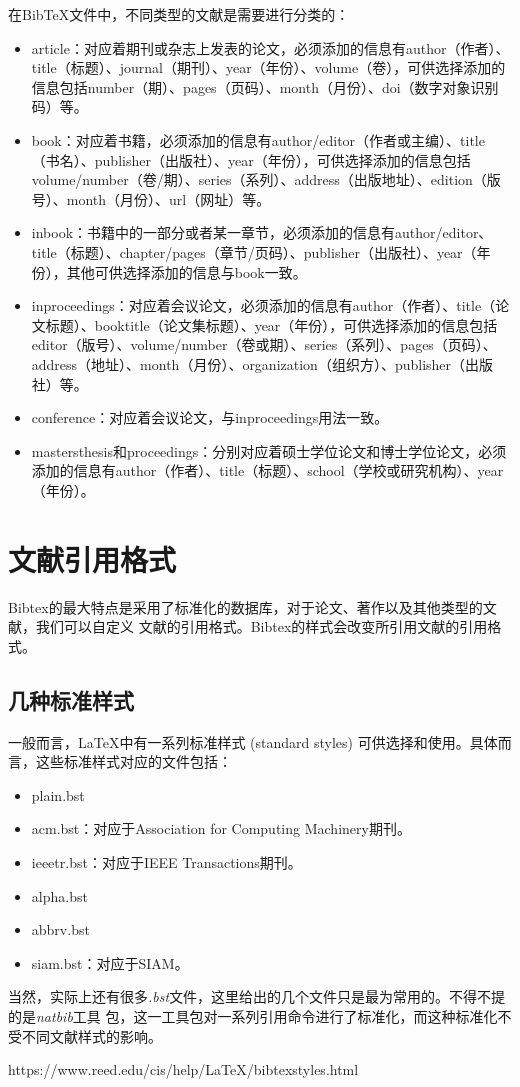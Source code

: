 在BibTeX文件中，不同类型的文献是需要进行分类的：
\begin{itemize}
    \item article：对应着期刊或杂志上发表的论文，必须添加的信息有author（作者）、title（标题）、journal（期刊）、year（年份）、volume（卷），可供选择添加的信息包括number（期）、pages（页码）、month（月份）、doi（数字对象识别码）等。
    \item book：对应着书籍，必须添加的信息有author/editor（作者或主编）、title（书名）、publisher（出版社）、year（年份），可供选择添加的信息包括volume/number（卷/期）、series（系列）、address（出版地址）、edition（版号）、month（月份）、url（网址）等。
    \item inbook：书籍中的一部分或者某一章节，必须添加的信息有author/editor、title（标题）、chapter/pages（章节/页码）、publisher（出版社）、year（年份），其他可供选择添加的信息与book一致。
    \item inproceedings：对应着会议论文，必须添加的信息有author（作者）、title（论文标题）、booktitle（论文集标题）、year（年份），可供选择添加的信息包括editor（版号）、volume/number（卷或期）、series（系列）、pages（页码）、address（地址）、month（月份）、organization（组织方）、publisher（出版社）等。
    \item conference：对应着会议论文，与inproceedings用法一致。
    \item mastersthesis和proceedings：分别对应着硕士学位论文和博士学位论文，必须添加的信息有author（作者）、title（标题）、school（学校或研究机构）、year（年份）。
\end{itemize}

\section{文献引用格式}

Bibtex的最大特点是采用了标准化的数据库，对于论文、著作以及其他类型的文献，我们可以自定义
文献的引用格式。Bibtex的样式会改变所引用文献的引用格式。

\subsection{几种标准样式}

一般而言，LaTeX中有一系列标准样式 (standard styles) 可供选择和使用。具体而言，这些标准样式对应的文件包括：
\begin{itemize}
    \item plain.bst
    \item acm.bst：对应于Association for Computing Machinery期刊。
    \item ieeetr.bst：对应于IEEE Transactions期刊。
    \item alpha.bst
    \item abbrv.bst
    \item siam.bst：对应于SIAM。
\end{itemize}

当然，实际上还有很多\emph{.bst}文件，这里给出的几个文件只是最为常用的。不得不提的是\emph{natbib}工具
包，这一工具包对一系列引用命令进行了标准化，而这种标准化不受不同文献样式的影响。

\begin{tcolorbox}[colback=red!5!white, colframe=red!50!black,
        title=Choosing a BibTeX Style:]
    https://www.reed.edu/cis/help/LaTeX/bibtexstyles.html
\end{tcolorbox}